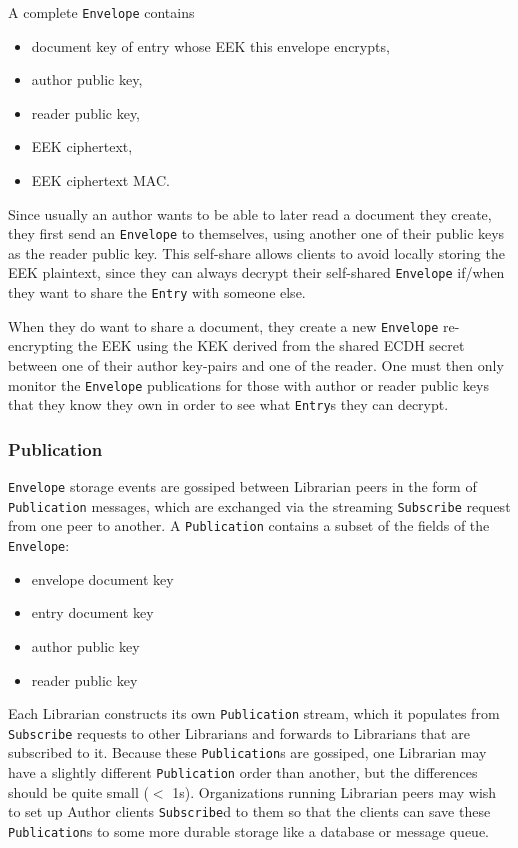 \documentclass[10pt]{article}
\newcommand{\ttt}[1]{\texttt{#1}}
\def\Entry{\ttt{Entry}}
\def\Envelope{\ttt{Envelope}}
\def\Publication{\ttt{Publication}}
\begin{document}
A complete \Envelope{} contains
\begin{itemize}
	\item document key of entry whose EEK this envelope encrypts,
	\item author public key,
	\item reader public key,
	\item EEK ciphertext,
	\item EEK ciphertext MAC.
\end{itemize}
Since usually an author wants to be able to later read a document they create, they first send an \Envelope{} to themselves, using another one of their public keys as the reader public key. This self-share allows clients to avoid locally storing the EEK plaintext, since they can always decrypt their self-shared \Envelope{} if/when they want to share the \Entry{} with someone else.

When they do want to share a document, they create a new \Envelope{} re-encrypting the EEK using the KEK derived from the shared ECDH secret between one of their author key-pairs and one of the reader. One must then only monitor the \Envelope{} publications for those with author or reader public keys that they know they own in order to see what \Entry{}s they can decrypt.

\subsubsection{Publication}

\Envelope{} storage events are gossiped between Librarian peers in the form of \Publication{} messages, which are exchanged via the streaming \ttt{Subscribe} request from one peer to another. A \Publication{} contains a subset of the fields of the \Envelope{}:
\begin{itemize}
	\item envelope document key
	\item entry document key
	\item author public key
	\item reader public key
\end{itemize}

Each Librarian constructs its own \Publication{} stream, which it populates from \ttt{Subscribe} requests to other Librarians and forwards to Librarians that are subscribed to it. Because these \texttt{Publication}s are gossiped, one Librarian may have a slightly different \Publication{} order than another, but the differences should be quite small ($<$ 1s). Organizations running Librarian peers may wish to set up Author clients \ttt{Subscribe}d to them so that the clients can save these \Publication{}s to some more durable storage like a database or message queue. 
\end{document}
